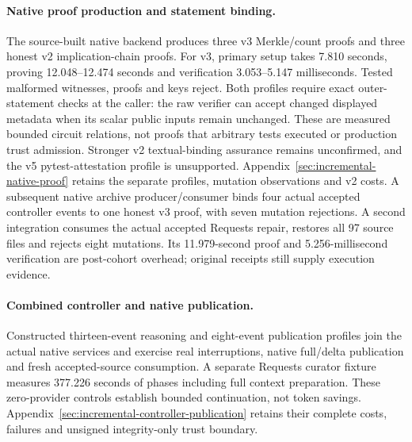 \paragraph{Native proof production and statement binding.}
The source-built native backend produces three v3 Merkle/count proofs and three
honest v2 implication-chain proofs. For v3, primary setup takes 7.810
seconds, proving 12.048--12.474 seconds and verification
3.053--5.147 milliseconds. Tested malformed witnesses, proofs and
keys reject. Both profiles require exact outer-statement checks at the caller:
the raw verifier can accept changed displayed metadata when its scalar public
inputs remain unchanged. These are measured bounded circuit relations, not
proofs that arbitrary tests executed or production trust admission. Stronger
v2 textual-binding assurance remains unconfirmed, and the v5 pytest-attestation
profile is unsupported. Appendix~\ref{sec:incremental-native-proof} retains the
separate profiles, mutation observations and v2 costs. A subsequent native
archive producer/consumer binds four actual accepted controller events to one
honest v3 proof, with seven mutation rejections. A second integration consumes
the actual accepted Requests repair, restores all 97 source files and rejects
eight mutations. Its 11.979-second proof and 5.256-millisecond verification
are post-cohort overhead; original receipts still supply execution evidence.

\paragraph{Combined controller and native publication.}
Constructed thirteen-event reasoning and eight-event publication profiles join
the actual native services and exercise real interruptions, native full/delta
publication and fresh accepted-source consumption. A separate Requests curator
fixture measures 377.226 seconds of phases including full context
preparation. These zero-provider controls establish bounded continuation,
not token savings. Appendix~\ref{sec:incremental-controller-publication} retains
their complete costs, failures and unsigned integrity-only trust boundary.

